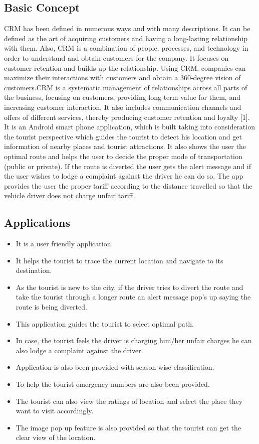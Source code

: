 \documentclass[12pt,a4paper]{article}
\begin{document}
\subsection{Basic Concept}
\hspace{0.7cm}CRM has been defined in numerous ways and with many descriptions. It can be defined as the art of acquiring customers and having a long-lasting relationship with them. Also, CRM is a combination of people, processes, and technology in order to understand and obtain customers for the company. It focuses on customer retention and builds up the relationship. 
Using CRM, companies can maximize their interactions with customers and obtain a 360-degree vision of customers.CRM is a systematic management of relationships across all parts of the business, focusing on customers, providing long-term value for them, and increasing customer interaction. It also includes communication channels and offers of different services, thereby producing customer retention and loyalty [1].
It is an Android smart phone application, which is built taking into consideration the tourist perspective which guides the tourist to detect his location and get information of nearby places and tourist attractions. It also shows the user the optimal route and helps the user to decide the proper mode of transportation (public or private). If the route is diverted the user gets the alert message and if the user wishes to lodge a complaint against the driver he can do so. The app provides the user the proper tariff according to the distance travelled so that the vehicle driver does not charge unfair tariff.
\\
\subsection{Applications}
\begin{itemize}
\item It is a user friendly application.
\item It helps the tourist to trace the current location and navigate to its destination.
\item As the tourist is new to the city, if the driver tries to divert the route and take the tourist through a longer route an alert message pop’s up saying the route is being diverted.
\item This application guides the tourist to select optimal path.
\item In case, the tourist feels the driver is charging him/her unfair charges he can also lodge a complaint against the driver.
\item Application is also been provided with season wise classification.
\item To help the tourist emergency numbers are also been provided.
\item The tourist can also view the ratings of location and select the place they want to visit accordingly.
\item The image pop up feature is also provided so that the tourist can get the clear view of the location.
\end{itemize}
\end{document}
